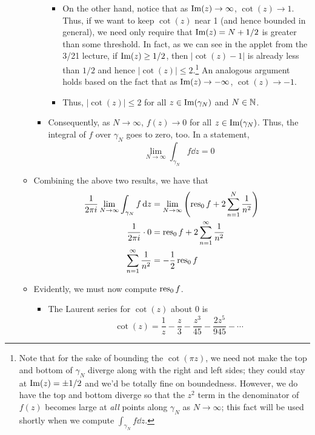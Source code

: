 \documentclass[../notes.tex]{subfiles}
\begin{document}
\begin{itemize}
\begin{itemize}
\begin{itemize}
\begin{itemize}
                \item On the other hand, notice that as $\operatorname{Im}(z)\to\infty$, $\cot(z)\to 1$. Thus, if we want to keep $\cot(z)$ near 1 (and hence bounded in general), we need only require that $\operatorname{Im}(z)=N+1/2$ is greater than some threshold. In fact, as we can see in the applet from the 3/21 lecture, if $\operatorname{Im}(z)\geq 1/2$, then $|\cot(z)-1|$ is already less than $1/2$ and hence $|\cot(z)|\leq 2$.\footnote{Note that for the sake of bounding the $\cot(\pi z)$, we need not make the top and bottom of $\gamma_N$ diverge along with the right and left sides; they could stay at $\operatorname{Im}(z)=\pm 1/2$ and we'd be totally fine on boundedness. However, we do have the top and bottom diverge so that the $z^2$ term in the denominator of $f(z)$ becomes large at \emph{all} points along $\gamma_N$ as $N\to\infty$; this fact will be used shortly when we compute $\int_{\gamma_N}f\dd{z}$.} An analogous argument holds based on the fact that as $\operatorname{Im}(z)\to -\infty$, $\cot(z)\to -1$.
                \item Thus, $|\cot(z)|\leq 2$ for all $z\in\operatorname{Im}(\gamma_N)$ and $N\in\mathbb{N}$.
            \end{itemize}
            \item Consequently, as $N\to\infty$, $f(z)\to 0$ for all $z\in\operatorname{Im}(\gamma_N)$. Thus, the integral of $f$ over $\gamma_N$ goes to zero, too. In a statement,
            \begin{equation*}
                \lim_{N\to\infty}\int_{\gamma_N}f\dd{z} = 0
            \end{equation*}
        \end{itemize}
        \item Combining the above two results, we have that
        \begin{align*}
            \frac{1}{2\pi i}\lim_{N\to\infty}\int_{\gamma_N}f\dd{z} &= \lim_{N\to\infty}\left( \operatorname{res}_0f+2\sum_{n=1}^N\frac{1}{n^2} \right)\\
            \frac{1}{2\pi i}\cdot 0 &= \operatorname{res}_0f+2\sum_{n=1}^\infty\frac{1}{n^2}\\
            \sum_{n=1}^\infty\frac{1}{n^2} &= -\frac{1}{2}\operatorname{res}_0f
        \end{align*}
        \item Evidently, we must now compute $\operatorname{res}_0f$.
        \begin{itemize}
            \item The Laurent series for $\cot(z)$ about 0 is
            \begin{equation*}
                \cot(z) = \frac{1}{z}-\frac{z}{3}-\frac{z^3}{45}-\frac{2z^5}{945}-\cdots

\end{equation*}
\end{itemize}
\end{itemize}
\end{itemize}
\end{document}
